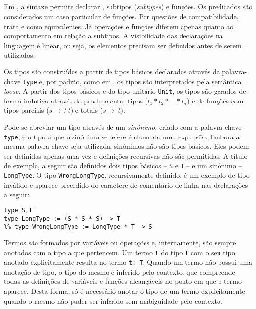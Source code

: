\subsection{\HasCASL}
Em \HasCASL, a sintaxe permite declarar \types, subtipos (\textit{subtypes}) e funções.
Os predicados são considerados um caso particular de funções.
Por questões de compatibilidade, \HasCASL trata \sorts e \types como equivalentes.
Já operações e funções diferem apenas quanto ao comportamento em relação a subtipos.
A visibilidade das declarações na linguagem é linear, ou seja, os elementos precisam ser definidos antes de serem utilizados.

Os tipos são construídos a partir de tipos básicos declarados através da palavra-chave \Verb.type. e, por padrão, como em \CASL, os tipos são interpretados pela semântica \textit{loose}.
A partir dos tipos básicos e do tipo unitário \Verb.Unit., os tipos são gerados de forma indutiva através do produto entre tipos ($t_{1} * t_{2} * \ldots * t_{n}$) e de funções com tipos parciais ($s \rightarrow?\ t$) e totais ($s \rightarrow\ t$).

Pode-se abreviar um tipo através de um \textit{sinônimo}, criado com a palavra-chave \Verb.type., e o tipo a que o sinônimo se refere é chamado uma expansão.
Embora a mesma palavra-chave seja utilizada, sinônimos não são tipos básicos.
Eles podem ser definidos apenas uma vez e definições recursivas não são permitidas.
A título de exemplo, a seguir são definidos dois tipos básicos -- \Verb.S. e \Verb.T. -- e um sinônimo -- \Verb.LongType..
O tipo \Verb.WrongLongType., recursivamente definido, é um exemplo de tipo inválido e aparece precedido do caractere de comentário de linha nas declarações a seguir:

\begin{Verbatim}
type S,T
type LongType := (S * S * S) -> T
%% type WrongLongType := LongType * T -> S
\end{Verbatim}

Termos são formados por variáveis ou operações e, internamente, são sempre anotados com o tipo a que pertencem.
Um termo \Verb.t. do tipo \Verb.T. com o seu tipo anotado explicitamente resulta no termo \Verb.t: T..
Quando um termo não possui uma anotação de tipo, o tipo do mesmo é inferido pelo contexto, que compreende todas as definições de variáveis e funções alcançáveis no ponto em que o termo aparece.
Desta forma, só é necessário anotar o tipo de um termo explicitamente quando o mesmo não puder ser inferido sem ambiguidade pelo contexto.

